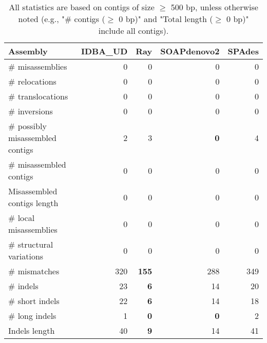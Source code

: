 \documentclass[12pt,a4paper]{article}
\begin{document}
\begin{table}[ht]
\begin{center}
\caption{All statistics are based on contigs of size $\geq$ 500 bp, unless otherwise noted (e.g., "\# contigs ($\geq$ 0 bp)" and "Total length ($\geq$ 0 bp)" include all contigs).}
\begin{tabular}{|l*{4}{|r}|}
\hline
Assembly & IDBA\_UD & Ray & SOAPdenovo2 & SPAdes \\ \hline
\# misassemblies & 0 & 0 & 0 & 0 \\ \hline
\hspace{5mm}\# relocations & 0 & 0 & 0 & 0 \\ \hline
\hspace{5mm}\# translocations & 0 & 0 & 0 & 0 \\ \hline
\hspace{5mm}\# inversions & 0 & 0 & 0 & 0 \\ \hline
\# possibly misassembled contigs & 2 & 3 & {\bf 0} & 4 \\ \hline
\# misassembled contigs & 0 & 0 & 0 & 0 \\ \hline
Misassembled contigs length & 0 & 0 & 0 & 0 \\ \hline
\# local misassemblies & 0 & 0 & 0 & 0 \\ \hline
\# structural variations & 0 & 0 & 0 & 0 \\ \hline
\# mismatches & 320 & {\bf 155} & 288 & 349 \\ \hline
\# indels & 23 & {\bf 6} & 14 & 20 \\ \hline
\hspace{5mm}\# short indels & 22 & {\bf 6} & 14 & 18 \\ \hline
\hspace{5mm}\# long indels & 1 & {\bf 0} & {\bf 0} & 2 \\ \hline
Indels length & 40 & {\bf 9} & 14 & 41 \\ \hline
\end{tabular}
\end{center}
\end{table}
\end{document}
